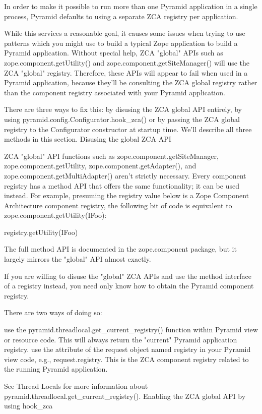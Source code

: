 \documentclass[a4paper,openany,twoside,final]{book}
\begin{document}
In order to make it possible to run more than one Pyramid application in a single process, Pyramid defaults to using a separate ZCA registry per application.

While this services a reasonable goal, it causes some issues when trying to use patterns which you might use to build a typical Zope application to build a Pyramid application. Without special help, ZCA "global" APIs such as zope.component.getUtility() and zope.component.getSiteManager() will use the ZCA "global" registry. Therefore, these APIs will appear to fail when used in a Pyramid application, because they'll be consulting the ZCA global registry rather than the component registry associated with your Pyramid application.

There are three ways to fix this: by disusing the ZCA global API entirely, by using pyramid.config.Configurator.hook_zca() or by passing the ZCA global registry to the Configurator constructor at startup time. We'll describe all three methods in this section.
Disusing the global ZCA API

ZCA "global" API functions such as zope.component.getSiteManager, zope.component.getUtility, zope.component.getAdapter(), and zope.component.getMultiAdapter() aren't strictly necessary. Every component registry has a method API that offers the same functionality; it can be used instead. For example, presuming the registry value below is a Zope Component Architecture component registry, the following bit of code is equivalent to zope.component.getUtility(IFoo):

registry.getUtility(IFoo)

The full method API is documented in the zope.component package, but it largely mirrors the "global" API almost exactly.

If you are willing to disuse the "global" ZCA APIs and use the method interface of a registry instead, you need only know how to obtain the Pyramid component registry.

There are two ways of doing so:

    use the pyramid.threadlocal.get_current_registry() function within Pyramid view or resource code. This will always return the "current" Pyramid application registry.
    use the attribute of the request object named registry in your Pyramid view code, e.g., request.registry. This is the ZCA component registry related to the running Pyramid application.

See Thread Locals for more information about pyramid.threadlocal.get_current_registry().
Enabling the ZCA global API by using hook_zca
\end{document}
